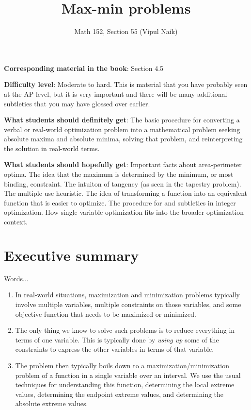 \documentclass[10pt]{amsart}
\title{Max-min problems}
\author{Math 152, Section 55 (Vipul Naik)}
\begin{document}
\maketitle

{\bf Corresponding material in the book}: Section 4.5

{\bf Difficulty level}: Moderate to hard. This is material that you
have probably seen at the AP level, but it is very important and there
will be many additional subtleties that you may have glossed over
earlier.

{\bf What students should definitely get}: The basic procedure for
converting a verbal or real-world optimization problem into a
mathematical problem seeking absolute maxima and absolute minima,
solving that problem, and reinterpreting the solution in real-world
terms.

{\bf What students should hopefully get}: Important facts about
area-perimeter optima. The idea that the maximum is determined by the
minimum, or most binding, constraint. The intuiton of tangency (as
seen in the tapestry problem). The multiple use heuristic. The idea of
transforming a function into an equivalent function that is easier to
optimize. The procedure for and subtleties in integer
optimization. How single-variable optimization fits into the broader
optimization context.

\section*{Executive summary}

Words...

\begin{enumerate}
\item In real-world situations, maximization and minimization problems
  typically involve multiple variables, multiple constraints on those
  variables, and some objective function that needs to be maximized or
  minimized.
\item The only thing we know to solve such problems is to reduce
  everything in terms of one variable. This is typically done by {\em
  using up} some of the constraints to express the other variables in
  terms of that variable.
\item The problem then typically boils down to a
  maximization/minimization problem of a function in a single variable
  over an interval. We use the usual techniques for understanding this
  function, determining the local extreme values, determining the
  endpoint extreme values, and determining the absolute extreme
  values.
\end{enumerate}
\end{document}
